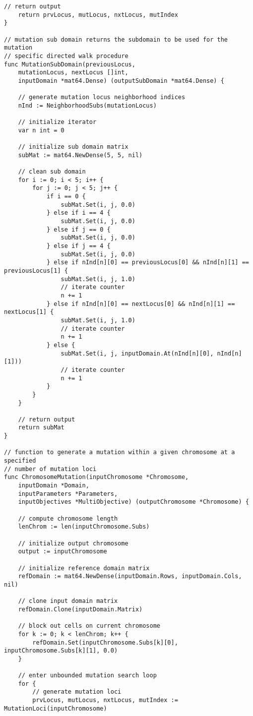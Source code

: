 \begin{lstlisting}[basicstyle=\tiny]
	// return output
	return prvLocus, mutLocus, nxtLocus, mutIndex
}

// mutation sub domain returns the subdomain to be used for the mutation
// specific directed walk procedure
func MutationSubDomain(previousLocus, 
    mutationLocus, nextLocus []int, 
    inputDomain *mat64.Dense) (outputSubDomain *mat64.Dense) {

	// generate mutation locus neighborhood indices
	nInd := NeighborhoodSubs(mutationLocus)

	// initialize iterator
	var n int = 0

	// initialize sub domain matrix
	subMat := mat64.NewDense(5, 5, nil)

	// clean sub domain
	for i := 0; i < 5; i++ {
		for j := 0; j < 5; j++ {
			if i == 0 {
				subMat.Set(i, j, 0.0)
			} else if i == 4 {
				subMat.Set(i, j, 0.0)
			} else if j == 0 {
				subMat.Set(i, j, 0.0)
			} else if j == 4 {
				subMat.Set(i, j, 0.0)
			} else if nInd[n][0] == previousLocus[0] && nInd[n][1] == previousLocus[1] {
				subMat.Set(i, j, 1.0)
				// iterate counter
				n += 1
			} else if nInd[n][0] == nextLocus[0] && nInd[n][1] == nextLocus[1] {
				subMat.Set(i, j, 1.0)
				// iterate counter
				n += 1
			} else {
				subMat.Set(i, j, inputDomain.At(nInd[n][0], nInd[n][1]))
				// iterate counter
				n += 1
			}
		}
	}

	// return output
	return subMat
}

// function to generate a mutation within a given chromosome at a specified
// number of mutation loci
func ChromosomeMutation(inputChromosome *Chromosome, 
    inputDomain *Domain, 
    inputParameters *Parameters, 
    inputObjectives *MultiObjective) (outputChromosome *Chromosome) {

	// compute chromosome length
	lenChrom := len(inputChromosome.Subs)

	// initialize output chromosome
	output := inputChromosome

	// initialize reference domain matrix
	refDomain := mat64.NewDense(inputDomain.Rows, inputDomain.Cols, nil)

	// clone input domain matrix
	refDomain.Clone(inputDomain.Matrix)

	// block out cells on current chromosome
	for k := 0; k < lenChrom; k++ {
		refDomain.Set(inputChromosome.Subs[k][0], inputChromosome.Subs[k][1], 0.0)
	}

	// enter unbounded mutation search loop
	for {
		// generate mutation loci
		prvLocus, mutLocus, nxtLocus, mutIndex := MutationLoci(inputChromosome)


\end{lstlisting}
